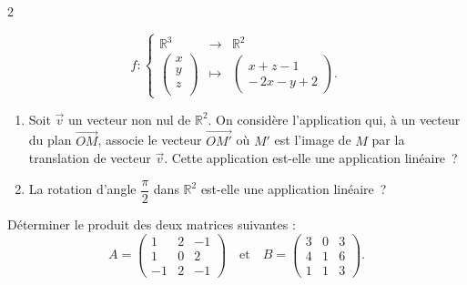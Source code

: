 \documentclass[a4paper,12pt]{article}
\begin{document}
\begin{multicols}{2}
\begin{exercice}[title=Exercice 6 $\star$ { [Raisonner, Calculer] }]{}{}
\begin{enumerate}
    \begin{equation*}
      f : \left \{
        \begin{array}{ccc}
          \mathbb{R}^3 &\longrightarrow &\mathbb{R}^2\\
          \begin{pmatrix}
            x\\
            y\\
            z\\
          \end{pmatrix} &\longmapsto &
      \begin{pmatrix}
        x + z - 1 \\
        -\,2x - y + 2
      \end{pmatrix}.
        \end{array} \right.
      \end{equation*}
  \end{enumerate}
\end{exercice}

\begin{exercice}[title=Exercice 7 $\star\star$ { [Représenter] }]{}{}
  \begin{enumerate}
    \item Soit $\vec{v}$ un vecteur non nul de $\mathbb{R}^2$. On considère l’application qui, à un vecteur du plan $\overrightarrow{OM}$, associe le vecteur $\overrightarrow{OM'}$ où $M'$ est l’image de $M$ par la translation de vecteur $\vec{v}$. Cette application est-elle une application linéaire ?
    \item La rotation d’angle $\dfrac{\pi}{2}$ dans $\mathbb{R}^2$ est-elle une application linéaire ?
  \end{enumerate}
\end{exercice}

\begin{exercice}[title=Exercice 8 $\star$ { [Calculer] }]{}{}
  Déterminer le produit des deux matrices suivantes :
  \[
    A
    =
    \begin{pmatrix}
      1 & 2 & -1 \\
      1 & 0 & 2 \\
      -1 & 2 & -1
    \end{pmatrix}
    \quad\text{et}\quad
    B
    =
    \begin{pmatrix}
      3 & 0 & 3 \\
      4 & 1 & 6 \\
      1 & 1 & 3
    \end{pmatrix}.
  \]
\end{exercice}


\end{multicols}
\end{document}
